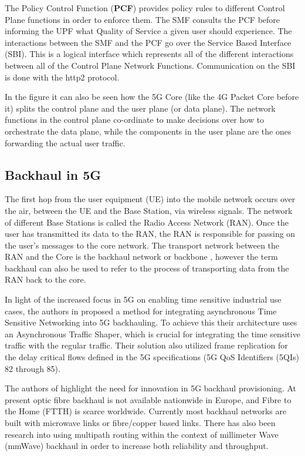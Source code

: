 The Policy Control Function (\textbf{PCF}) provides policy rules to different Control Plane functions in order to enforce them. The SMF consults the PCF before informing the UPF what Quality of Service a given user should experience. The interactions between the SMF and the PCF go over the Service Based Interface (SBI). This is a logical interface which represents all of the different interactions between all of the Control Plane Network Functions. Communication on the SBI is done with the http2 protocol.

In the figure it can also be seen how the 5G Core (like the 4G Packet Core before it) splits the control plane and the user plane (or data plane). The network functions in the control plane co-ordinate to make decisions over how to orchestrate the data plane, while the components in the user plane are the ones forwarding the actual user traffic.

\subsection{Backhaul in 5G}

The first hop from the user equipment (UE) into the mobile network occurs over the air, between the UE and the Base Station, via wireless signals. The network of different Base Stations is called the Radio Access Network (RAN). Once the user has transmitted its data to the RAN, the RAN is responsible for passing on the user's messages to the core network. The transport network between the RAN and the Core is the backhaul network or backbone \cite{jaber20165g}, however the term backhaul can also be used to refer to the process of transporting data from the RAN back to the core.

In light of the increased focus in 5G on enabling time sensitive industrial use cases, the authors in \cite{prados2021asynchronous} proposed a method for integrating asynchronous Time Sensitive Networking into 5G backhauling. To achieve this their architecture uses an Asynchronous Traffic Shaper, which is crucial for integrating the time sensitive traffic with the regular traffic. Their solution also utilized frame replication for the delay critical flows defined in the 5G specifications (5G QoS Identifiers (5QIs) 82 through 85).

The authors of \cite{jaber20165g} highlight the need for innovation in 5G backhaul provisioning. At present optic fibre backhaul is not available nationwide in Europe, and Fibre to the Home (FTTH) is scarce worldwide. Currently most backhaul networks are built with microwave links or fibre/copper based links. There has also been research \cite{seppanen2016multipath, saadat2018multipath} into using multipath routing within the context of millimeter Wave (mmWave) backhaul in order to increase both reliability and throughput.

